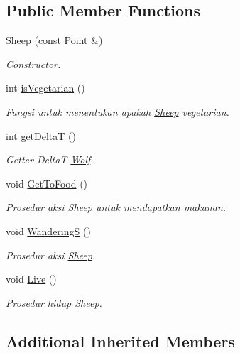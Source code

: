 \subsection*{Public Member Functions}
\begin{DoxyCompactItemize}
\item 
\hyperlink{class_sheep_a4b3c6eac247be02dfbc9628d594cd04d}{Sheep} (const \hyperlink{class_point}{Point} \&)
\begin{DoxyCompactList}\small\item\em Constructor. \end{DoxyCompactList}\item 
int \hyperlink{class_sheep_a5210b51ab73a9f562111405d6e0ecb46}{is\+Vegetarian} ()
\begin{DoxyCompactList}\small\item\em Fungsi untuk menentukan apakah \hyperlink{class_sheep}{Sheep} vegetarian. \end{DoxyCompactList}\item 
int \hyperlink{class_sheep_ab308d0c603fd3405d5acd5717497a47b}{get\+DeltaT} ()
\begin{DoxyCompactList}\small\item\em Getter DeltaT \hyperlink{class_wolf}{Wolf}. \end{DoxyCompactList}\item 
void \hyperlink{class_sheep_a134766a3fc3060b5a1dd39aa11df262d}{Get\+To\+Food} ()
\begin{DoxyCompactList}\small\item\em Prosedur aksi \hyperlink{class_sheep}{Sheep} untuk mendapatkan makanan. \end{DoxyCompactList}\item 
void \hyperlink{class_sheep_a12881246b7b1d6bffee53c38da151281}{WanderingS} ()
\begin{DoxyCompactList}\small\item\em Prosedur aksi \hyperlink{class_sheep}{Sheep}. \end{DoxyCompactList}\item 
void \hyperlink{class_sheep_a3a808c6656a9d932f5ec4043c301727b}{Live} ()
\begin{DoxyCompactList}\small\item\em Prosedur hidup \hyperlink{class_sheep}{Sheep}. \end{DoxyCompactList}\end{DoxyCompactItemize}
\subsection*{Additional Inherited Members}



